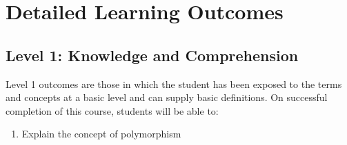 \documentclass[12pt]{scrartcl}
\begin{document}
\section{Detailed Learning Outcomes}

\subsection*{Level 1: Knowledge and Comprehension}
Level 1 outcomes are those in which the student has been exposed to the terms and concepts at a basic level and can supply basic definitions. On successful completion of this course, students will be able to:
\begin{enumerate}
   \item Explain the concept of polymorphism
\end{enumerate}
\end{document}
